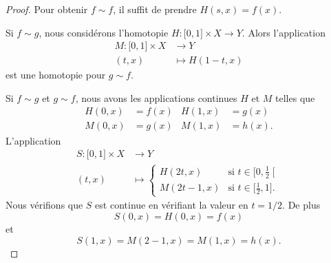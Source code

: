 \begin{proof}
	Pour obtenir \( f\sim f\), il suffit de prendre \( H(s,x)=f(x)\).

	Si \( f\sim g\), nous considérons l'homotopie \( H\colon \mathopen[ 0 , 1 \mathclose]\times X\to Y\). Alors l'application
	\begin{equation}
		\begin{aligned}
			M\colon \mathopen[ 0 , 1 \mathclose]\times X & \to Y            \\
			(t,x)                                        & \mapsto H(1-t,x)
		\end{aligned}
	\end{equation}
	est une homotopie pour \( g\sim f\).

	Si \( f\sim g\) et \( g\sim f\), nous avons les applications continues \( H\) et \( M\) telles que
	\begin{subequations}
		\begin{align}
			H(0,x) & =f(x) & H(1,x) & =g(x)  \\
			M(0,x) & =g(x) & M(1,x) & =h(x).
		\end{align}
	\end{subequations}
	L'application
	\begin{equation}
		\begin{aligned}
			S\colon \mathopen[ 0 , 1 \mathclose]\times X & \to Y                                                                                 \\
			(t,x)                                        & \mapsto \begin{cases}
				                                                       H(2t,x)   & \text{si } t\in\mathopen[ 0 , \frac{ 1 }{2} \mathclose[ \\
				                                                       M(2t-1,x) & \text{si }t\in\mathopen[ \frac{ 1 }{2} , 1 \mathclose].
			                                                       \end{cases}
		\end{aligned}
	\end{equation}
	Nous vérifions que \( S\) est continue en vérifiant la valeur en \( t=1/2\). De plus
	\begin{equation}
		S(0,x)=H(0,x)=f(x)
	\end{equation}
	et
	\begin{equation}
		S(1,x)=M(2-1,x)=M(1,x)=h(x).
	\end{equation}
\end{proof}


